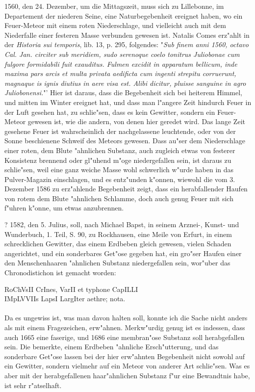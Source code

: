 \documentclass[a4paper, 11pt, oneside, polutonikogreek, german]{article}
\begin{document}
1560, den 24. Dezember, um die Mittagszeit, muss sich zu Lillebonne, im Departement der niederen Seine, eine Naturbegebenheit ereignet haben, wo ein Feuer-Meteor mit einem roten Niederschlage, und vielleicht auch mit dem Niederfalle einer festeren Masse verbunden gewesen ist. Natalis Comes erz"ahlt in der \emph{Historia sui temporis}, lib. 13, p. 295, folgendes: "\emph{Sub finem anni 1560, octavo Cal. Jan. circiter sub meridiem, sudo serenoque coelo tonitrus Juliobonae cum fulgore formidabili fuit exauditus. Fulmen excidit in apparatum bellicum, inde maxima pars arcis et multa privata aedificta cum ingenti strepitu corruerunt, magnaque is ignis diutius in aere visa est. Alibi dicitur, pluisse sanguine in agro Juliobonensi.}"' Hier ist daraus, dass die Begebenheit sich bei heiterem Himmel, und mitten im Winter ereignet hat, und dass man l"angere Zeit hindurch Feuer in der Luft gesehen hat, zu schlie"sen, dass es kein Gewitter, sondern ein Feuer-Meteor gewesen ist, wie die andern, von denen hier geredet wird. Das lange Zeit gesehene Feuer ist wahrscheinlich der nachgelassene leuchtende, oder von der Sonne beschienene Schweif des Meteors gewesen. Dass au"ser dem Niederschlage einer roten, dem Blute "ahnlichen Substanz, auch zugleich etwas von festerer Konsistenz brennend oder gl"uhend m"oge niedergefallen sein, ist daraus zu schlie"sen, weil eine ganz weiche Masse wohl schwerlich w"urde haben in das Pulver-Magazin einschlagen, und es entz"unden k"onnen, wiewohl die vom 3. Dezember 1586 zu erz"ahlende Begebenheit zeigt, dass ein herabfallender Haufen von rotem dem Blute "ahnlichen Schlamme, doch auch genug Feuer mit sich f"uhren k"onne, um etwas anzubrennen.

? 1582, den 5. Julius, soll, nach Michael Bapst, in seinem Arznei-, Kunst- und Wunderbuch, 1. Teil, S. 90, zu Rockhausen, eine Meile von Erfurt, in einem schrecklichen Gewitter, das einem Erdbeben gleich gewesen, vielen Schaden angerichtet, und ein sonderbares Get"ose gegeben hat, ein gro"ser Haufen einer den Menschenhaaren "ahnlichen Substanz niedergefallen sein, wor"uber das Chronodistichon ist gemacht worden:
\begin{center}
RoChVsII CrInes, VarII et typhone CapILLI\\
IMpLVVIIs LapsI LargIter aethre; nota.
\end{center}
\paragraph{}
Da es ungewiss ist, was man davon halten soll, konnte ich die Sache nicht anders als mit einem Fragezeichen, erw"ahnen. Merkw"urdig genug ist es indessen, dass auch 1665 eine faserige, und 1686 eine membran"ose Substanz soll herabgefallen sein. Die bemerkte, einem Erdbeben "ahnliche Ersch"utterung, und das sonderbare Get"ose lassen bei der hier erw"ahnten Begebenheit nicht sowohl auf ein Gewitter, sondern vielmehr auf ein Meteor von anderer Art schlie"sen. Was es aber mit der herabgefallenen haar"ahnlichen Substanz f"ur eine Bewandtnis habe, ist sehr r"atselhaft.
\end{document}
